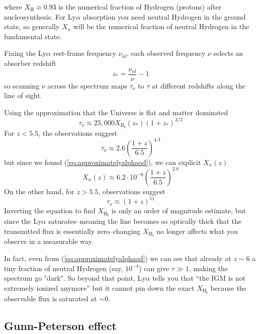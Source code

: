where $X_{\text{H}} \approx 0.93$ is the numerical fraction of Hydrogen (protons) after nucleosynthesis. For Ly$\alpha$ absorption you need neutral Hydrogen in the ground state, so generally $X_{n}$ will be the numerical fraction of neutral Hydrogen in the fundamental state.
\par Fixing the Ly$\alpha$ rest-frame frequency $\nu_{ul}$, each observed frequency $\nu$ selects an absorber redshift
\begin{equation*}
    z_{*} = \frac{\nu_{ul}}{\nu}-1
\end{equation*}
so scanning $\nu$ across the spectrum maps $\tau_{\nu}$ to $\tau$ at different redshifts along the line of sight.
\par Using the approximation that the Universe is flat and matter dominated
\begin{equation}
    \tau_{\nu} \approx 25,000 X_{\text{H}_{\text{I}}}(z_{*})(1+z_{*})^{3/2}
    \label{eq:approximatelyalphaod}
\end{equation}
For $z<5.5$, the observations suggest 
\begin{equation*}
    \tau_{\nu}\approx 2.6\left(\frac{1+z}{6.5}\right)^{4.3}
\end{equation*}
but since we found (\ref{eq:approximatelyalphaod}), we can explicit $X_{n}(z)$
\begin{equation*}
    X_{n}(z)\approx 6.2\cdot 10^{-6}\left(\frac{1+z}{6.5}\right)^{2.8}
\end{equation*}
On the other hand, for $z>5.5$, observations suggest
\begin{equation*}
    \tau_{\nu}\approx (1+z)^{11}
\end{equation*}
Inverting the equation to find $X_{\text{H}_{\text{I}}}$ is only an order of magnitude estimate, but since the Ly$\alpha$ saturates--meaning the line becomes so optically thick that the transmitted flux is essentially zero--changing $X_{\text{H}_{\text{I}}}$ no longer affects what you observe in a measurable way.
\par In fact, even from (\ref{eq:approximatelyalphaod}) we can see that already at $z\sim 6$ a tiny fraction of neutral Hydrogen (say, $10^{-4}$) can give $\tau \gg 1$, making the spectrum go "dark". So beyond that point, Ly$\alpha$ tells you that “the IGM is not extremely ionized anymore” but it cannot pin down the exact $X_{\text{H}_{\text{I}}}$ because the observable flux is saturated at $\sim 0$.

\subsection{Gunn-Peterson effect}

